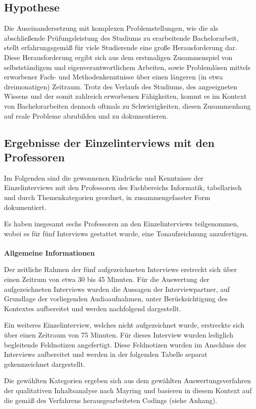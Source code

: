 \documentclass{scrreprt}
\begin{document}
\subsection{Hypothese}
\par Die Auseinandersetzung mit komplexen Problemstellungen, wie die als abschließende Prüfungsleistung des Studiums zu erarbeitende Bachelorarbeit, stellt erfahrungsgemäß für viele Studierende eine große Herausforderung dar. Diese Herausforderung ergibt sich aus dem erstmaligen Zusammenspiel von selbstständigem und eigenverantwortlichem Arbeiten, sowie Problemlösen mittels erworbener Fach- und Methodenkenntnisse über einen längeren (in etwa dreimonatigen) Zeitraum.
Trotz des Verlaufs des Studiums, des angeeigneten Wissens und der somit zahlreich erworbenen Fähigkeiten, kommt es im Kontext von Bachelorarbeiten dennoch oftmals zu Schwierigkeiten, diesen Zusammenhang auf reale Probleme abzubilden und zu dokumentieren.

\subsection{Ergebnisse der Einzelinterviews mit den Professoren}
\par Im Folgenden sind die gewonnenen Eindrücke und Kenntnisse der Einzelinterviews mit den Professoren des Fachbereichs Informatik, tabellarisch und durch Themenkategorien geordnet, in zusammengefasster Form dokumentiert. \\
\par Es haben insgesamt sechs Professoren an den Einzelinterviews teilgenommen, wobei es für fünf Interviews gestattet wurde, eine Tonaufzeichnung anzufertigen.\\\\
\textbf{Allgemeine Informationen}
\par Der zeitliche Rahmen der fünf aufgezeichneten Interviews erstreckt sich über einen Zeitrum von etwa 30 bis 45 Minuten. Für die Auswertung der aufgezeichneten Interviews wurden die Aussagen der Interviewpartner, auf Grundlage der vorliegenden Audioaufnahmen, unter Berücksichtigung des Kontextes aufbereitet und werden nachfolgend dargestellt.\\
\par Ein weiteres Einzelinterview, welches nicht aufgezeichnet wurde, erstreckte sich über einen Zeitraum von 75 Minuten. Für dieses Interview wurden lediglich begleitende Feldnotizen angefertigt. Diese Feldnotizen wurden im Anschluss des Interviews aufbereitet und werden in der folgenden Tabelle separat gekennzeichnet dargestellt.\\
\par Die gewählten Kategorien ergeben sich aus dem gewählten Auswertungsverfahren der qualitativen Inhaltsanalyse nach Mayring und basieren in diesem Kontext auf die gemäß des Verfahrens herausgearbeiteten Codings (siehe Anhang).
\end{document}
